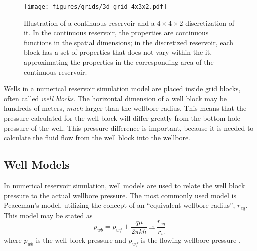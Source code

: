 \begin{figure}[htbp]
    \centering
    \texttt{[image: figures/grids/3d\_grid\_4x3x2.pdf]}
    \caption{Illustration of a continuous reservoir and a $4\times 4\times 2$ discretization of it. In the continuous reservoir, the properties are continuous functions in the spatial dimensions; in the discretized reservoir, each block has a set of properties that does not vary within the it, approximating the properties in the corresponding area of the continuous reservoir.}
    \label{fig:grid-discretization}
\end{figure}


Wells in a numerical reservoir simulation model are placed inside grid blocks, often called \emph{well blocks}. The horizontal dimension of a well block may be hundreds of meters, \emph{much} larger than the wellbore radius. This means that the pressure calculated for the well block will differ greatly from the bottom-hole pressure of the well. This pressure difference is important, because it is needed to calculate the fluid flow  from the well block into the wellbore.

\subsection{Well Models} %
\label{sub:well_models}
In numerical reservoir simulation, well models are used to relate the well block pressure to the actual wellbore pressure. The most commonly used model is Peaceman's model, utilizing the concept of an ``equivalent wellbore radius'', $r_{eq}$. This model may be stated as
\begin{equation}
    \label{eq:intro-well-model}
    p_{wb} = p_{wf} + \frac{q\mu}{2\pi k h} \ln \frac{r_{eq}}{r_{w}}
\end{equation}
where $p_{wb}$ is the well block pressure and $p_{wf}$ is the flowing wellbore pressure \cite{Peaceman1990Interpretation}.

